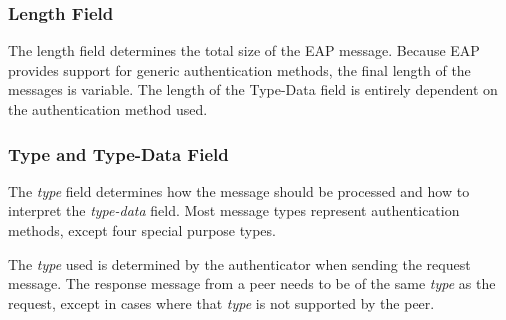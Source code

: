\subsubsection{Length Field}
The length field determines the total size of the EAP message. Because EAP provides support for generic authentication methods, the final length of the messages is variable.
The length of the Type-Data field is entirely dependent on the authentication method used.


\subsubsection{Type and Type-Data Field}
The \textit{type} field determines how the message should be processed and how to interpret the \textit{type-data} field.
Most message types represent authentication methods, except four special purpose types.

The \textit{type} used is determined by the authenticator when sending the request message. The response message from a peer needs to be of the same \textit{type} as the request, except in cases where that \textit{type} is not supported by the peer.


